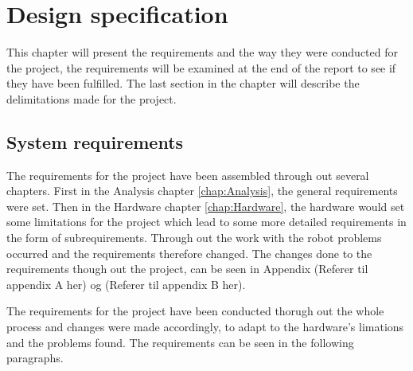 \chapter{Design specification}
\label{chap:Design specification}
This chapter will present the requirements and the way they were conducted for the project, the requirements will be examined at the end of the report to see if they have been fulfilled. The last section in the chapter will describe the delimitations made for the project.

\section{System requirements}
\label{sec:System requirements}
The requirements for the project have been assembled through out several chapters. First in the Analysis chapter \ref{chap:Analysis}, the general requirements were set. Then in the Hardware chapter \ref{chap:Hardware}, the hardware would set some limitations for the project which lead to some more detailed requirements in the form of subrequirements.
Through out the work with the robot problems occurred and the requirements therefore changed. The changes done to the requirements though out the project, can be seen in Appendix (Referer til appendix A her) og (Referer til appendix B her).

The requirements for the project have been conducted thorugh out the whole process and changes were made accordingly, to adapt to the hardware's limations and the problems found. The requirements can be seen in the following paragraphs. 

